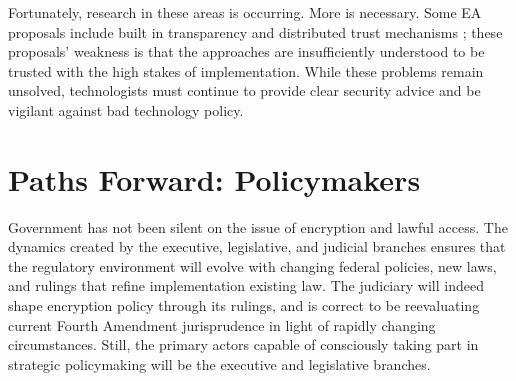 
\taskend

Fortunately, research in these areas is occurring. More is necessary. Some \ac{EA} proposals include built in
transparency and distributed trust mechanisms \cite{goos_oblivious_1996} \cite{phan_key_2017}
\cite{servan_schreiber_jje_2020}; these proposals' weakness is that the approaches are insufficiently understood to be
trusted with the high stakes of implementation. While these problems remain unsolved, technologists must continue to
provide clear security advice and be vigilant against bad technology policy.


\section{Paths Forward: Policymakers}


Government has not been silent on the issue of encryption and lawful access. The dynamics created by the executive,
legislative, and judicial branches ensures that the regulatory environment will evolve with changing federal policies,
new laws, and rulings that refine implementation existing law. The judiciary will indeed shape encryption policy through
its rulings, and is correct to be reevaluating current Fourth Amendment jurisprudence in light of rapidly changing
circumstances. Still, the primary actors capable of consciously taking part in strategic policymaking will be the
executive and legislative branches.

